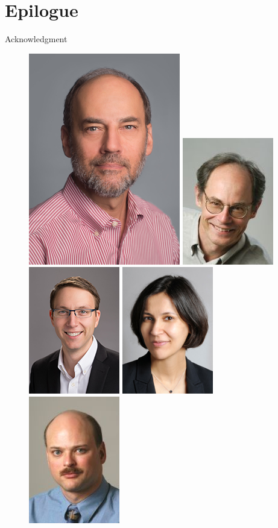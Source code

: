 \section{Epilogue}

\begin{frame}{Acknowledgment}

  \begin{figure}
    \includegraphics[width=0.15\linewidth]{figures/lee.jpg}
    \hfill
    \includegraphics[width=0.15\linewidth]{figures/wawrzynek.jpg}
    \hfill
    \includegraphics[width=0.15\linewidth]{figures/hartmann.jpg}
    \hfill
    \includegraphics[width=0.15\linewidth]{figures/ratnasamy.jpg}
    \hfill
    \includegraphics[width=0.15\linewidth]{figures/kubiatowicz.jpg}
    \hfill
  \end{figure}


\end{frame}
